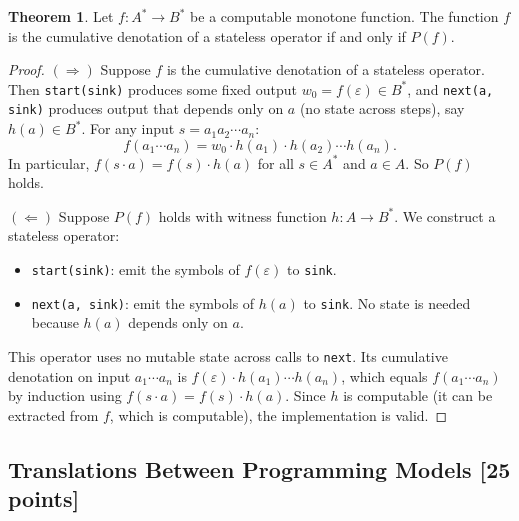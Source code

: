 \documentclass[11pt]{article}
\newcommand{\mnt}[1]{{\small\texttt{#1}}}
\theoremstyle{definition}
\newtheorem{myTheorem}[thm]{Theorem}{\bfseries}{}
\newcommand{\kstar}{^{\textstyle *}}
\begin{document}
\begin{myTheorem}
	\label{thm:stateless}
	Let $f: A\kstar \to B\kstar$ be a computable monotone function. The function $f$ is the cumulative denotation of a stateless operator if and only if $P(f)$.
\end{myTheorem}
\begin{proof}
	$(\Rightarrow)$ Suppose $f$ is the cumulative denotation of a stateless operator. Then \mnt{start(sink)} produces some fixed output $w_0 = f(\varepsilon) \in B\kstar$, and \mnt{next(a, sink)} produces output that depends only on $a$ (no state across steps), say $h(a) \in B\kstar$. For any input $s = a_1 a_2 \cdots a_n$:
	\[
		f(a_1 \cdots a_n) = w_0 \cdot h(a_1) \cdot h(a_2) \cdots h(a_n).
	\]
	In particular, $f(s \cdot a) = f(s) \cdot h(a)$ for all $s \in A\kstar$ and $a \in A$. So $P(f)$ holds.

	$(\Leftarrow)$ Suppose $P(f)$ holds with witness function $h: A \to B\kstar$. We construct a stateless operator:
	\begin{itemize}
		\item \mnt{start(sink)}: emit the symbols of $f(\varepsilon)$ to \mnt{sink}.
		\item \mnt{next(a, sink)}: emit the symbols of $h(a)$ to \mnt{sink}. No state is needed because $h(a)$ depends only on $a$.
	\end{itemize}
	This operator uses no mutable state across calls to \mnt{next}. Its cumulative denotation on input $a_1 \cdots a_n$ is $f(\varepsilon) \cdot h(a_1) \cdots h(a_n)$, which equals $f(a_1 \cdots a_n)$ by induction using $f(s \cdot a) = f(s) \cdot h(a)$. Since $h$ is computable (it can be extracted from $f$, which is computable), the implementation is valid.
\end{proof}

\clearpage %
\subsection{Translations Between Programming Models [25 points]}
\end{document}
